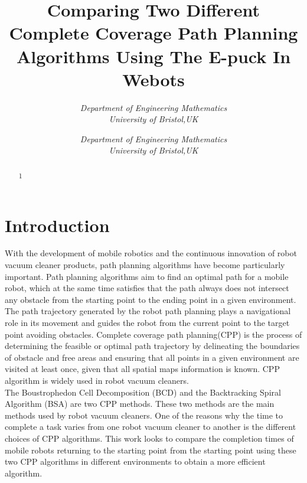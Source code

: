 \documentclass[conference]{IEEEtran}
\begin{document}
\title{Comparing Two Different Complete Coverage Path Planning Algorithms Using The E-puck In Webots}

\author{
  \textit{Department of Engineering Mathematics}\\
  \textit{University of Bristol,UK}
  \and
  \textit{Department of Engineering Mathematics}\\
  \textit{University of Bristol,UK}
}

\maketitle

\begin{abstract}
1
\end{abstract}


\section{Introduction}
With the development of mobile robotics and the continuous innovation of robot vacuum cleaner products, path planning algorithms have become particularly important. Path planning algorithms aim to find an optimal path for a mobile robot, which at the same time satisfies that the path always does not intersect any obstacle from the starting point to the ending point in a given environment. The path trajectory generated by the robot path planning plays a navigational role in its movement and guides the robot from the current point to the target point avoiding obstacles. Complete coverage path planning(CPP) is the process of determining the feasible or optimal path trajectory by delineating the boundaries of obstacle and free areas and ensuring that all points in a given environment are visited at least once, given that all spatial maps information is known. CPP algorithm is widely used in robot vacuum cleaners\cite{colegrave1994case}.\\
The Boustrophedon Cell Decomposition (BCD)\cite{lavalle2006planning} and the Backtracking Spiral Algorithm (BSA)\cite{gonzalez2005bsa} are two CPP methods. These two methods are the main methods used by robot vacuum cleaners. One of the reasons why the time to complete a task varies from one robot vacuum cleaner to another is the different choices of CPP algorithms. This work looks to compare the completion times of mobile robots returning to the starting point from the starting point using these two CPP algorithms in different environments to obtain a more efficient algorithm.
\end{document}
